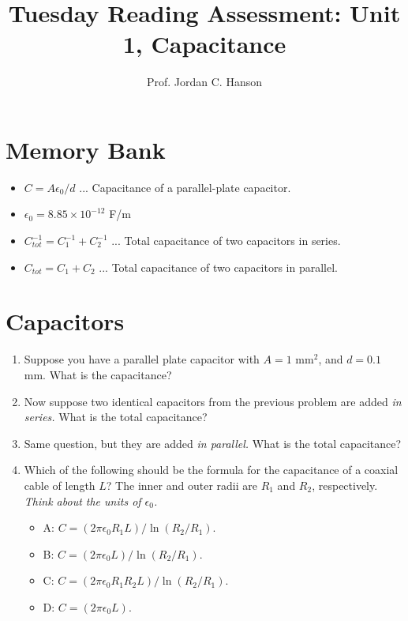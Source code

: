 \documentclass{article}
\begin{document}
\title{Tuesday Reading Assessment: Unit 1, Capacitance}
\author{Prof. Jordan C. Hanson}

\maketitle

\section{Memory Bank}

\begin{itemize}
\item $C = A\epsilon_0/d$ ... Capacitance of a parallel-plate capacitor.
\item $\epsilon_0 = 8.85 \times 10^{-12}$ F/m
\item $C_{tot}^{-1} = C_1^{-1} + C_2^{-1}$ ... Total capacitance of two capacitors in series.
\item $C_{tot} = C_1 + C_2$ ... Total capacitance of two capacitors in parallel.
\end{itemize}

\section{Capacitors}

\begin{enumerate}
\item Suppose you have a parallel plate capacitor with $A = 1$ mm$^2$, and $d = 0.1$ mm.  What is the capacitance? \\ \vspace{1cm}
\item Now suppose two identical capacitors from the previous problem are added \textit{in series.}  What is the total capacitance? \\ \vspace{1cm}
\item Same question, but they are added \textit{in parallel.} What is the total capacitance? \\ \vspace{1cm}
\item Which of the following should be the formula for the capacitance of a coaxial cable of length $L$?  The inner and outer radii are $R_1$ and $R_2$, respectively.  \textit{Think about the units of $\epsilon_0$.}
\begin{itemize}
\item A: $C = (2\pi\epsilon_0 R_1 L)/\ln(R_2/R_1)$.
\item B: $C = (2\pi\epsilon_0 L)/\ln(R_2/R_1)$.
\item C: $C = (2\pi\epsilon_0 R_1 R_2 L)/\ln(R_2/R_1)$.
\item D: $C = (2\pi\epsilon_0 L)$.
\end{itemize}
\end{enumerate}
\end{document}
